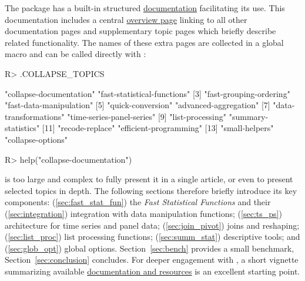\documentclass[article]{jss}
\begin{document}
The package has a built-in structured \href{https://sebkrantz.github.io/collapse/reference/collapse-documentation.html}{documentation} facilitating its use. This documentation includes a central \href{https://sebkrantz.github.io/collapse/reference/collapse-documentation.html}{overview page} linking to all other documentation pages and supplementary topic pages which briefly describe related functionality. The names of these extra pages are collected in a global macro  and can be called directly with :
%
\begin{Schunk}
\begin{Sinput}
R> .COLLAPSE_TOPICS
\end{Sinput}
\begin{Soutput}
 [1] "collapse-documentation"     "fast-statistical-functions"
 [3] "fast-grouping-ordering"     "fast-data-manipulation"    
 [5] "quick-conversion"           "advanced-aggregation"      
 [7] "data-transformations"       "time-series-panel-series"  
 [9] "list-processing"            "summary-statistics"        
[11] "recode-replace"             "efficient-programming"     
[13] "small-helpers"              "collapse-options"          
\end{Soutput}
\begin{Sinput}
R> help("collapse-documentation")
\end{Sinput}
\end{Schunk}
%
 is too large and complex to fully present it in a single article, or even to present selected topics in depth. The following sections therefore briefly introduce its key components: (\ref{sec:fast_stat_fun}) the \emph{Fast Statistical Functions} and their (\ref{sec:integration}) integration with data manipulation functions; (\ref{sec:ts_ps}) architecture for time series and panel data; (\ref{sec:join_pivot}) joins and reshaping; (\ref{sec:list_proc}) list processing functions; (\ref{sec:summ_stat}) descriptive tools; and (\ref{sec:glob_opt}) global options. Section~\ref{sec:bench} provides a small benchmark, Section~\ref{sec:conclusion} concludes. For deeper engagement with , a short vignette summarizing available \href{https://sebkrantz.github.io/collapse/articles/collapse_documentation.html}{documentation and resources} is an excellent starting point.
%
\end{document}
